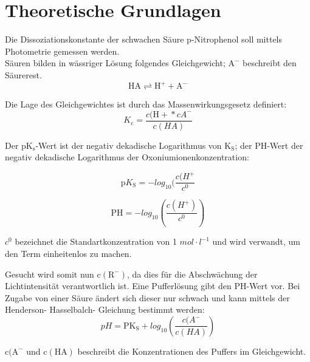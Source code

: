 \documentclass[12pt,a4paper,titlepage,headinclude,bibtotoc]{scrartcl}
\begin{document}
\tableofcontents

\newpage

\section{Theoretische Grundlagen}

Die Dissoziationskonstante der schwachen Säure p-Nitrophenol soll mittels Photometrie gemessen werden. \\
Säuren bilden in wässriger Lösung folgendes Gleichgewicht; $\mathrm{A^-}$ beschreibt den Säurerest.\\

\begin{equation}
\mathrm{HA}  \rightleftharpoons \mathrm{H^+} + \mathrm{A^-}
\end{equation}

Die Lage des Gleichgewichtes ist durch das Massenwirkungsgesetz definiert:\\

\begin{equation}
K_\mathrm{c} =\frac{c(\mathrm{H+}*c{A^-}}{c(HA)}
\end{equation}

Der $\mathrm{pK_s}$-Wert ist der negativ dekadische Logarithmus von $\mathrm{K_S}$; der PH-Wert der negativ dekadische Logarithmus der Oxoniumionenkonzentration:

\begin{equation}
\mathrm{p}K_\mathrm{S} = - log_{10} (\frac{c(H^+}{c^0}
\end{equation}

\begin{equation}
\mathrm{PH}= -log_{10}(\frac{c(H^+)}{c^0})
\end{equation}

$c^0$ bezeichnet die Standartkonzentration von 1 $mol\cdot l^{-1}$ und wird verwandt, um den Term einheitenlos zu machen.


Gesucht wird somit nun $\mathrm{c(R^-)}$, da dies für die Abschwächung der Lichtintensität verantwortlich ist. Eine Pufferlösung gibt den PH-Wert vor. Bei Zugabe von einer Säure ändert sich dieser nur schwach und kann mittels der Henderson- Hasselbalch- Gleichung bestimmt werden: \\

\begin{equation}
pH = \mathrm{PK_S} + log_{10}\left( \frac{c(A^-}{c(HA)}\right)
\end{equation}

$\mathrm{c(A^-}$ und $\mathrm{c(HA)}$ beschreibt die Konzentrationen des Puffers im Gleichgewicht. \\
\end{document}
